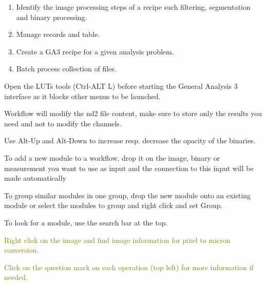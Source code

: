 
\begin{enumerate}
    \item[\textbullet] Identify the image processing steps of a recipe such filtering, segmentation and binary processing.
    \item[\textbullet] Manage records and table.
    \item[\textbullet] Create a GA3 recipe for a given analysis problem.
    \item[\textbullet] Batch process collection of files.
\end{enumerate}


\begin{enumerate}
    \item[\textbullet] Open the LUTs tools (Ctrl-ALT L) before starting the General Analysis 3 interface as it blocks other menus to be launched.
    \item[\textbullet]	Workflow will modify the nd2 file content, make sure to store only the results you need and not to modify the channels.
    \item[\textbullet]	Use Alt-Up and Alt-Down to increase resp. decrease the opacity of the binaries.
    \item[\textbullet]	To add a new module to a workflow, drop it on the image, binary or measurement you want to use as input and the connection to this input will be made automatically
    \item[\textbullet]	To group similar modules in one group, drop the new module onto an existing module or select the modules to group and right click and set Group.
    \item[\textbullet]	To look for a module, use the search bar at the top.
    \textcolor{olive}{\item [\textbullet] Right click on the image and find image information for pixel to micron conversion.}
    \textcolor{olive}{\item [\textbullet] Click on the question mark on each operation (top left) for more information if needed.}
\end{enumerate}